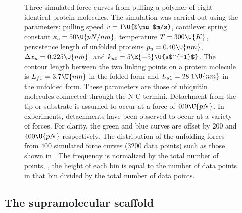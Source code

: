 \begin{figure}
  \begin{center}
    \hspace{.25in}%
    \caption{\protect{} Three simulated force
      curves from pulling a polymer of eight identical protein
      molecules.  The simulation was carried out using the parameters:
      pulling speed $v=1\U{$\mu$m/s}$, cantilever spring constant
      $\kappa_c=50\U{pN/nm}$, temperature $T=300\U{K}$, persistence
      length of unfolded proteins $p_u=0.40\U{nm}$, $\Delta
      x_u=0.225\U{nm}$, and $k_{u0}=5\E{-5}\U{s$^{-1}$}$.  The contour
      length between the two linking points on a protein molecule is
      $L_{f1}=3.7\U{nm}$ in the folded form and $L_{u1}=28.1\U{nm}$ in
      the unfolded form.  These parameters are those of ubiquitin
      molecules connected through the N-C
      termini\citep{chyan04,carrion-vazquez03}.  Detachment from the
      tip or substrate is assumed to occur at a force of $400\U{pN}$.
      In experiments, detachments have been observed to occur at a
      variety of forces.  For clarity, the green and blue curves are
      offset by $200$ and $400\U{pN}$ respectively.
      \protect{} The distribution of the unfolding
      forces from $400$ simulated force curves ($3200$ data points)
      such as those shown in \protect{}. The
      frequency is normalized by the total number of points, \ie, the
      height of each bin is equal to the number of data points in that
      bin divided by the total number of data
      points.\label{fig:sawsim:sim-all}}
  \end{center}
\end{figure}

\subsection{The supramolecular scaffold}
\label{sec:sawsim:results:scaffold}

